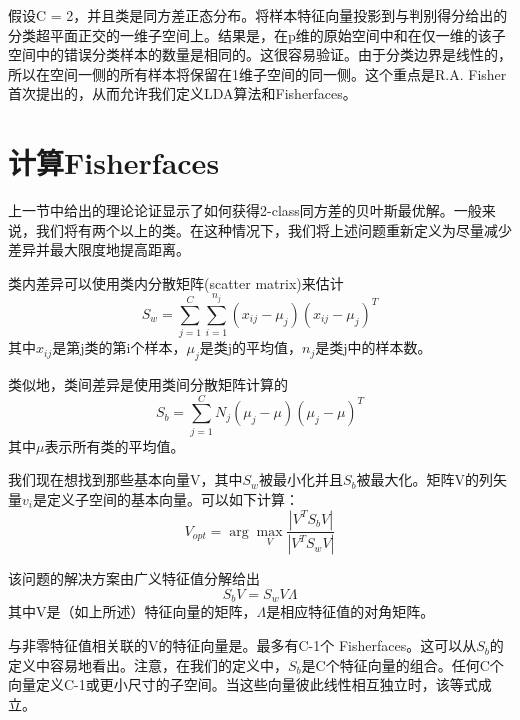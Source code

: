 \documentclass[UTF8]{ctexart}
\begin{document}
假设C = 2，并且类是同方差正态分布。将样本特征向量投影到与判别得分给出的分类超平面正交的一维子空间上。结果是，在p维的原始空间中和在仅一维的该子空间中的错误分类样本的数量是相同的。这很容易验证。由于分类边界是线性的，所以在空间一侧的所有样本将保留在1维子空间的同一侧。这个重点是R.A. Fisher首次提出的，从而允许我们定义LDA算法和Fisherfaces。

\section{计算Fisherfaces}
上一节中给出的理论论证显示了如何获得2-class同方差的贝叶斯最优解。一般来说，我们将有两个以上的类。在这种情况下，我们将上述问题重新定义为尽量减少{\color{blue}{类内（within-class）}}差异并最大限度地提高{\color{blue}{类间（between-class）}}距离。

类内差异可以使用类内分散矩阵(scatter matrix)来估计
\begin{equation}
S_w =\sum_{j = 1}^C \sum_{i = 1}^{n_j}(x_{ij}-\mu_j)(x_{ij}-\mu_j)^T
\end{equation}
其中$x_{ij}$是第j类的第i个样本，$\mu_j$是类j的平均值，$n_j$是类j中的样本数。

类似地，类间差异是使用类间分散矩阵计算的
\begin{equation}
S_b =\sum_{j = 1}^C N_j (\mu_j-\mu)(\mu_j-\mu)^T
\end{equation}
其中$\mu$表示所有类的平均值。

我们现在想找到那些基本向量V，其中$S_w$被最小化并且$S_b$被最大化。矩阵V的列矢量$v_i$是定义子空间的基本向量。可以如下计算：
\begin{equation}
	V_{opt} =\arg \max_V \frac{|V^TS_bV|}{|V^TS_wV|}
\end{equation}

该问题的解决方案由广义特征值分解给出
\begin{equation}
	S_bV = S_wV\Lambda
\end{equation}
其中V是（如上所述）特征向量的矩阵，$\Lambda$是相应特征值的对角矩阵。

与非零特征值相关联的V的特征向量是{\color{blue}{Fisherfaces}}。最多有C-1个 Fisherfaces。这可以从$S_b$的定义中容易地看出。注意，在我们的定义中，$S_b$是C个特征向量的组合。任何C个向量定义C-1或更小尺寸的子空间。当这些向量彼此线性相互独立时，该等式成立。



\end{document}
